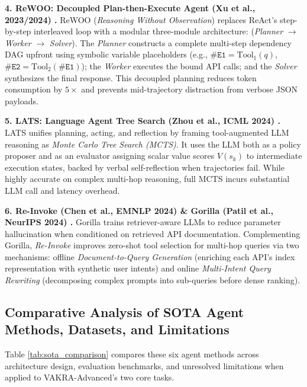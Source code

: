 \documentclass[10pt]{article}
\begin{document}
\textbf{4. ReWOO: Decoupled Plan-then-Execute Agent (Xu et al., 2023/2024) \cite{xu2023rewoo}.}
ReWOO (\textit{Reasoning Without Observation}) replaces ReAct's step-by-step interleaved loop with a modular three-module architecture: (\textit{Planner} $\rightarrow$ \textit{Worker} $\rightarrow$ \textit{Solver}). The \textit{Planner} constructs a complete multi-step dependency DAG upfront using symbolic variable placeholders (e.g., $\texttt{\#E1} = \text{Tool}_1(q)$, $\texttt{\#E2} = \text{Tool}_2(\texttt{\#E1})$); the \textit{Worker} executes the bound API calls; and the \textit{Solver} synthesizes the final response. This decoupled planning reduces token consumption by $5\times$ and prevents mid-trajectory distraction from verbose JSON payloads.

\textbf{5. LATS: Language Agent Tree Search (Zhou et al., ICML 2024) \cite{zhou2024lats}.}
LATS unifies planning, acting, and reflection by framing tool-augmented LLM reasoning as \textit{Monte Carlo Tree Search (MCTS)}. It uses the LLM both as a policy proposer and as an evaluator assigning scalar value scores $V(s_k)$ to intermediate execution states, backed by verbal self-reflection when trajectories fail. While highly accurate on complex multi-hop reasoning, full MCTS incurs substantial LLM call and latency overhead.

\textbf{6. Re-Invoke (Chen et al., EMNLP 2024) \cite{chen2024reinvoke} \& Gorilla (Patil et al., NeurIPS 2024) \cite{patil2024gorilla}.}
Gorilla trains retriever-aware LLMs to reduce parameter hallucination when conditioned on retrieved API documentation. Complementing Gorilla, \textit{Re-Invoke} improves zero-shot tool selection for multi-hop queries via two mechanisms: offline \textit{Document-to-Query Generation} (enriching each API's index representation with synthetic user intents) and online \textit{Multi-Intent Query Rewriting} (decomposing complex prompts into sub-queries before dense ranking).

\subsection{Comparative Analysis of SOTA Agent Methods, Datasets, and Limitations}

Table \ref{tab:sota_comparison} compares these six agent methods across architecture design, evaluation benchmarks, and unresolved limitations when applied to VAKRA-Advanced's two core tasks.
\end{document}
